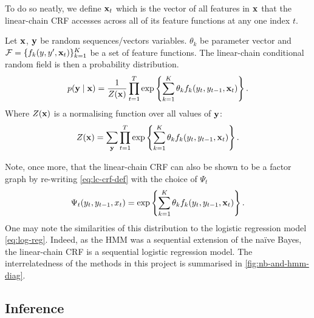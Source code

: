 \documentclass[../main.tex]{subfiles}
\begin{document}
To do so neatly, we define $\mathbf{x}_t$ which is the vector of all features in $\mathbf{x}$ that the linear-chain CRF accesses across all of its feature functions at any one index $t$.
\begin{definition}
    Let $\mathbf{x}$, $\mathbf{y}$ be random sequences/vectors variables.
    $\theta_k$ be parameter vector and $\mathcal{F} = \{ f_k (y,y',\mathbf{x}_t) \}_{k=1}^K$ be a set of feature functions.
    The linear-chain conditional random field is then a probability distribution.
    \begin{equation} \label{eq:lc-crf-def}
        p(\mathbf{y} \mid \mathbf{x}) = \frac{1}{Z(\mathbf{x})} \prod_{t=1}^{T} \exp \left\{ \sum_{k=1}^K \theta_k f_k (y_t, y_{t-1}, \mathbf{x}_t) \right\}.
    \end{equation}
    Where $Z(\mathbf{x})$ is a normalising function over all values of $\mathbf{y}$:
    \begin{equation*}
        Z(\mathbf{x}) = \sum_{\mathbf{y}} \prod_{t=1}^{T} \exp \left\{ \sum_{k=1}^K \theta_k f_k (y_t, y_{t-1}, \mathbf{x}_t) \right\}.
    \end{equation*}
\end{definition}
Note, once more, that the linear-chain CRF can also be shown to be a factor graph by re-writing \cref{eq:lc-crf-def} with the choice of $\Psi_t$
\begin{equation} \label{eq:crf-factor-graph}
    \Psi_t(y_t, y_{t-1}, x_t) = \exp \left\{ \sum_{k=1}^K \theta_k f_k (y_t, y_{t-1}, \mathbf{x}_t) \right\}.
\end{equation}
One may note the similarities of this distribution to the logistic regression model \cref{eq:log-reg}. Indeed, as the HMM was a sequential extension of the na{\"i}ve Bayes, the linear-chain CRF is a sequential logistic regression model.
The interrelatedness of the methods in this project is summarised in \cref{fig:nb-and-hmm-diag}.


\subsection{Inference}
\end{document}
